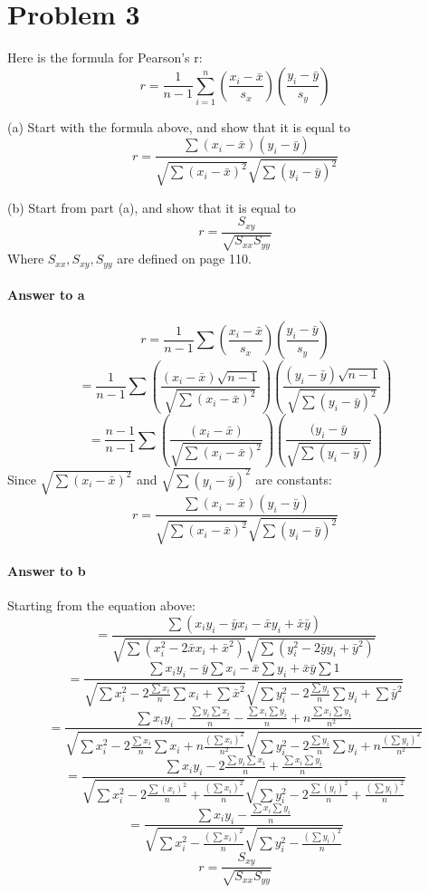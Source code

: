 \documentclass{article}
\newcommand{\p}[1]{\paragraph{#1}} %
\begin{document}
\clearpage
\section*{Problem 3} %

	Here is the formula for Pearson's r:
	\[ r = \frac{1}{n-1}\sum_{i=1}^{n}\left(\frac{x_i - \bar{x}}{s_x}\right)\left(\frac{y_i - \bar{y}}{s_y}
	\right) \]
	
	(a) Start with the formula above, and show that it is equal to
	\[ r = \frac{\sum(x_i-\bar{x})(y_i-\bar{y})}{\sqrt{\sum(x_i-\bar{x})^2}\sqrt{\sum(y_i-\bar{y})^2}} \]
	
	(b) Start from part (a), and show that it is equal to
	\[ r = \frac{S_{xy}}{\sqrt{S_{xx}S_{yy}}} \]
	Where $S_{xx},S_{xy},S_{yy}$ are defined on page 110.
	
	\p{Answer to a}
	\[ r = \frac{1}{n-1}\sum\left(\frac{x_i-\bar{x}}{s_x}\right)\left(\frac{y_i-\bar{y}}{s_y}\right) \]
	\[ = \frac{1}{n-1}\sum\left(\frac{(x_i-\bar{x})\sqrt{n-1}}{\sqrt{\sum(x_i-\bar{x})^2}}\right) 
	\left(\frac{(y_i-\bar{y})\sqrt{n-1}}{\sqrt{\sum(y_i-\bar{y})^2}}\right) \]
	\[ = \frac{n-1}{n-1}\sum\left(\frac{(x_i-\bar{x})}{\sqrt{\sum(x_i-\bar{x})^2}}\right) 
	\left(\frac{(y_i-\bar{y}}{\sqrt{\sum(y_i-\bar{y})}}\right) \]
	Since $\sqrt{\sum(x_i-\bar{x})^2}$ and $\sqrt{\sum(y_i-\bar{y})^2}$ are constants:
	\[ r = \frac{\sum(x_i-\bar{x})(y_i-\bar{y})}{\sqrt{\sum(x_i-\bar{x})^2}\sqrt{\sum(y_i-\bar{y})^2}} \]
	
	\p{Answer to b}
	Starting from the equation above:
	\[ = \frac{\sum (x_iy_i - \bar{y}x_i - \bar{x}y_i + \bar{x}\bar{y})}
	{\sqrt{\sum(x_i^2 - 2\bar{x}x_i + \bar{x}^2)}\sqrt{\sum(y_i^2 - 2\bar{y}y_i + \bar{y}^2)}} \]
	\[ = \frac{\sum x_iy_i - \bar{y}\sum x_i - \bar{x}\sum y_i + \bar{x}\bar{y}\sum 1}
	{\sqrt{\sum x_i^2 - 2\frac{\sum x_i}{n}\sum x_i + \sum\bar{x}^2}
	 \sqrt{\sum y_i^2 - 2\frac{\sum y_i}{n}\sum y_i + \sum\bar{y}^2}} \]
	\[ = \frac{\sum x_iy_i - \frac{\sum y_i\sum x_i}{n} - \frac{\sum x_i\sum y_i}{n} + n\frac{\sum x_i
	\sum y_i}{n^2}}
	{\sqrt{\sum x_i^2 - 2\frac{\sum x_i}{n}\sum x_i + n\frac{(\sum x_i)^2}{n^2}}
	 \sqrt{\sum y_i^2 - 2\frac{\sum y_i}{n}\sum y_i + n\frac{(\sum y_i)^2}{n^2}}} \]
	\[ = \frac{\sum x_iy_i - 2\frac{\sum y_i\sum x_i}{n} + \frac{\sum x_i\sum y_i}{n}}
	{\sqrt{\sum x_i^2 - 2\frac{\sum (x_i)^2}{n} + \frac{(\sum x_i)^2}{n}}
	 \sqrt{\sum y_i^2 - 2\frac{\sum (y_i)^2}{n} + \frac{(\sum y_i)^2}{n}}} \]
	\[ = \frac{\sum x_iy_i - \frac{\sum x_i\sum y_i}{n}}
	{\sqrt{\sum x_i^2 - \frac{(\sum x_i)^2}{n}}
	 \sqrt{\sum y_i^2 - \frac{(\sum y_i)^2}{n}}} \]
	\[ r = \frac{S_{xy}}{\sqrt{S_{xx}S_{yy}}} \] 
\end{document}
